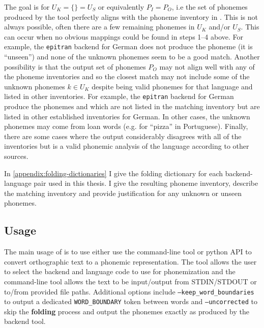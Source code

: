 The goal is for $U_K = \{\} = U_S$ or equivalently $P_I = P_O$, i.e the set of phonemes produced by the tool perfectly aligns with the phoneme inventory in \phoible. This is not always possible, often there are a few remaining phonemes in $U_K$ and/or $U_S$. This can occur when no obvious mappings could be found in steps 1--4 above. For example, the \texttt{epitran} backend for German does not produce the phoneme  (it is ``unseen'') and none of the unknown phonemes seem to be a good match. Another possibility is that the output set of phonemes $P_O$ may not align well with any of the \phoible phoneme inventories and so the closest match may not include some of the unknown phonemes $k \in U_K$ despite being valid phonemes for that language and listed in other inventories. For example, the \texttt{epitran} backend for German produce the phonemes  and  which are not listed in the matching inventory but are listed in other established inventories for German. In other cases, the unknown phonemes may come from loan words (e.g.  for ``pizza'' in Portuguese). Finally, there are some cases where the output considerably disagrees with all of the \phoible inventories but is a valid phonemic analysis of the language according to other sources.


In \cref{appendix:folding-dictionaries} I give the folding dictionary for each backend-language pair used in this thesis. I give the resulting phoneme inventory, describe the matching \phoible inventory and provide justification for any unknown or unseen phonemes.

\subsection{Usage}
\label{sec:dataset-usage}


The main usage of \corpusphonemizer is to use either use the command-line tool or python API to convert orthographic text to a phonemic representation. The tool allows the user to select the backend and language code to use for phonemization and the command-line tool allows the text to be input/output from STDIN/STDOUT or to/from provided file paths. Additional options include \texttt{--keep\_word\_boundaries} to output a dedicated \texttt{WORD\_BOUNDARY} token between words and \texttt{--uncorrected} to skip the \textbf{folding} process and output the phonemes exactly as produced by the backend tool. 

